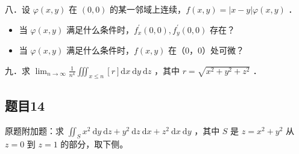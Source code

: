 \documentclass{article}
\begin{document}
八．设 \(\varphi(x, y)\) 在 \((0,0)\) 的某一邻域上连续，\(f(x, y)=|x-y| \varphi(x, y)\) ．

\begin{itemize}
  \item[（1）] 当 \(\varphi(x, y)\) 满足什么条件时，\(f_{x}^{\prime}(0,0), f_{y}^{\prime}(0,0)\) 存在？
  \item[（2）] 当 \(\varphi(x, y)\) 满足什么条件时，\(f(x, y)\) 在（0，0）处可微？
\end{itemize}

九．求 \(\lim _{n \rightarrow \infty} \frac{1}{n^{4}} \iiint_{x \leq n}[r] \mathrm{d} x \mathrm{~d} y \mathrm{~d} z\) ，其中 \(r=\sqrt{x^{2}+y^{2}+z^{2}}\) ．

\subsection{题目14}
原题附加题：求 \(\iint_{S} x^{2} \mathrm{~d} y \mathrm{~d} z+y^{2} \mathrm{~d} z \mathrm{~d} x+z^{2} \mathrm{~d} x \mathrm{~d} y\) ，其中 \(S\) 是 \(z=x^{2}+y^{2}\) 从 \(z=0\) 到 \(z=1\) 的部分，取下侧。
\end{document}
